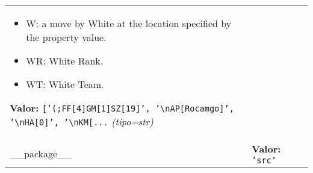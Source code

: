 \begin{longtable}{|p{\varnamewidth}|p{\vardescrwidth}|l}
\begin{itemize}
\item W: a move by White at the location specified by the property value.

\item WR: White Rank.

\item WT: White Team.

\end{itemize}

\textbf{Valor:} 
{\tt \texttt{[}\texttt{'}\texttt{(;FF[4]GM[1]SZ[19]}\texttt{'}\texttt{, }\texttt{'}\texttt{{\textbackslash}nAP[Rocamgo]}\texttt{'}\texttt{, }\texttt{'}\texttt{{\textbackslash}nHA[0]}\texttt{'}\texttt{, }\texttt{'}\texttt{{\textbackslash}nKM[}\texttt{...}}            {\it (tipo=str)}&\\
\cline{1-2}
\raggedright \_\-\_\-p\-a\-c\-k\-a\-g\-e\-\_\-\_\- & \raggedright \textbf{Valor:} 
{\tt \texttt{'}\texttt{src}\texttt{'}}&\\
\cline{1-2}
\end{longtable}

